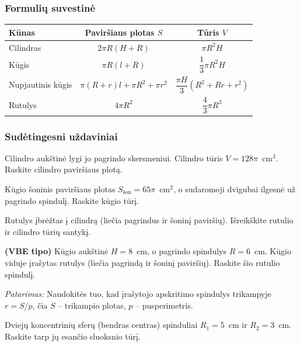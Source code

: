 \subsubsection*{Formulių suvestinė}

\begin{tcolorbox}[title={Sukimosi kūnų formulių lentelė}, colback=blue!5, colframe=blue!50!black]
\begin{center}
\renewcommand{\arraystretch}{1.8}
\begin{tabular}{|l|c|c|}
\hline
\textbf{Kūnas} & \textbf{Paviršiaus plotas} $S$ & \textbf{Tūris} $V$ \\
\hline
Cilindras & $2\pi R(H + R)$ & $\pi R^2 H$ \\
\hline
Kūgis & $\pi R(l + R)$ & $\dfrac{1}{3}\pi R^2 H$ \\
\hline
Nupjautinis kūgis & $\pi(R+r)l + \pi R^2 + \pi r^2$ & $\dfrac{\pi H}{3}(R^2+Rr+r^2)$ \\
\hline
Rutulys & $4\pi R^2$ & $\dfrac{4}{3}\pi R^3$ \\
\hline
\end{tabular}
\end{center}
\end{tcolorbox}

\subsubsection*{Sudėtingesni uždaviniai}

\begin{exercise}
Cilindro aukštinė lygi jo pagrindo skersmeniui. Cilindro tūris $V = 128\pi$~cm$^3$. Raskite cilindro paviršiaus plotą.
\end{exercise}

\begin{exercise}
Kūgio šoninis paviršiaus plotas $S_{\text{šon}} = 65\pi$~cm$^2$, o sudaromoji dvigubai ilgesnė už pagrindo spindulį. Raskite kūgio tūrį.
\end{exercise}

\begin{exercise}
Rutulys įbrėžtas į cilindrą (liečia pagrindus ir šoninį paviršių). Išreikškite rutulio ir cilindro tūrių santykį.
\end{exercise}

\begin{exercise}
\textbf{(VBE tipo)} Kūgio aukštinė $H = 8$~cm, o pagrindo spindulys $R = 6$~cm. Kūgio viduje įrašytas rutulys (liečia pagrindą ir šoninį paviršių). Raskite šio rutulio spindulį.

\textit{Patarimas:} Naudokitės tuo, kad įrašytojo apskritimo spindulys trikampyje $r = S/p$, čia $S$ -- trikampio plotas, $p$ -- pusperimetris.
\end{exercise}

\begin{exercise}
Dviejų koncentrinių sferų (bendras centras) spinduliai $R_1 = 5$~cm ir $R_2 = 3$~cm. Raskite tarp jų esančio sluoksnio tūrį.
\end{exercise}

